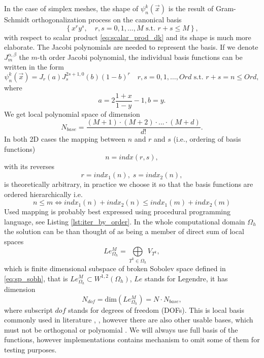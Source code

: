 In the case of simplex meshes, the shape of $\psi_n^k(\vec{x})$ is the result of 
Gram-Schmidt orthogonalization process on the canonical basis 
\begin{equation}
    \label{eq:tens_canon}
    \left\{ x^ry^s,  \quad r, s = 0,1, \dots, M \text{ s.t. } r + s \leq M\right\},
\end{equation}
with respect to scalar product \eqref{eq:scalar_prod_dk}
and its shape is much more elaborate. The Jacobi polynomials are needed to 
represent the basis. If we denote $J^{\alpha, \beta}_m$ the $m$-th order 
Jacobi polynomial, the individual basis functions can be written in the form 
\cite{Hesthaven2008}
\begin{equation}
\psi_n^k(\vec{x}) = J_r(a)J^{2s+1, 0}_s(b)(1 - b)^r\quad r, s = 0,1, \dots, 
Ord \text{ s.t. } r + s = n \leq Ord,
\end{equation}
where
\begin{equation}
a = 2 \frac{1 + x}{1 - y} - 1, b = y.
\end{equation}
We get local polynomial space of dimension
\begin{equation}
N_{base} =  \frac{(M + 1) \cdot (M + 2) \cdot ... \cdot (M + d)}{d!}.
\end{equation}
In both 2D cases the mapping between $n$ and $r$ and $s$ (i.e., ordering of 
basis functions) 
\begin{equation}
\label{eq:bindx}
n = indx(r, s),
\end{equation}
with its reverses
\begin{equation}
r = indx_1(n),\; s = indx_2(n),
\end{equation}
is theoretically arbitrary, in practice we choose it so that the basis 
functions are ordered hierarchically i.e.
\begin{equation}
n \leq m \Leftrightarrow indx_1(n) + indx_2(n) \leq indx_1(m) + indx_2(m)
\end{equation}
Used mapping is probably best expressed using procedural programming language,
see Listing \ref{lst:iter_by_order}.
In the whole computational domain $\Omega_h$ the solution can be than thought 
of as being a member of direct sum of local spaces
\begin{equation}
Le_{\Omega_h}^{M} = \bigoplus\limits_{T^k \in \Omega_h} V_{T^k},
\end{equation}
which is finite dimensional subspace of broken Sobolev space defined in 
\eqref{eq:sp_sobh}, 
that is $Le_{\Omega_h}^{M} \subset  W^{1,2}(\Omega_h)$, $Le$ stands for Legendre, it has 
dimension
\begin{equation}
\label{eq:dim_legh}
N_{dof} = \text{dim}(Le_{\Omega_h}^{M}) = N\cdot N_{base},
\end{equation}
where subscript $dof$ stands for degrees of freedom (DOFs). This is local basis commonly 
used in literature \cite{Hesthaven2008}, \cite{Bokhove2008}, however there are also other 
usable bases, which must not be orthogonal or polynomial \cite{Yuan2006}. We will always 
use full basis of the functions, however implementations contains mechanism to omit 
some of them for testing purposes.

